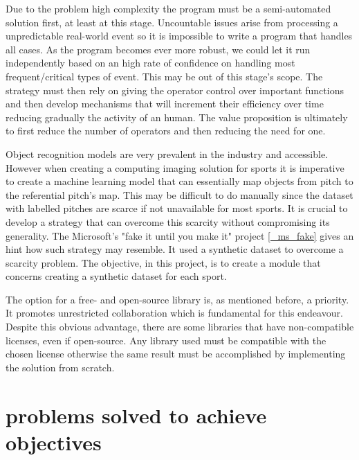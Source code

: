 \documentclass[
11pt,
twoside
]{report}
\begin{document}
Due to the problem high complexity the program must be a semi-automated solution first, at least at this stage. Uncountable issues arise from processing a unpredictable real-world event so it is impossible to write a program that handles all cases. As the program becomes ever more robust, we could let it run independently based on an high rate of confidence on handling most frequent/critical types of event. This may be out of this stage's scope. The strategy must then rely on giving the operator control over important functions and then develop mechanisms that will increment their efficiency over time reducing gradually the activity of an human. The value proposition is ultimately to first reduce the number of operators and then reducing the need for one.


Object recognition models are very prevalent in the industry and accessible. However when creating a computing imaging solution for sports it is imperative to create a machine learning model that can essentially map objects from pitch to the referential pitch's map. This may be difficult to do manually since the dataset with labelled pitches are scarce if not unavailable for most sports. It is crucial to develop a strategy that can overcome this scarcity without compromising its generality. The Microsoft's "fake it until you make it" project \ref{_ms_fake} gives an hint how such strategy may resemble. It used a synthetic dataset to overcome a scarcity problem. The objective, in this project, is to create a module that concerns creating a synthetic dataset for each sport.


The option for a free- and open-source library is, as mentioned before, a priority. It promotes unrestricted collaboration which is fundamental for this endeavour. Despite this obvious advantage, there are some libraries that have non-compatible licenses, even if open-source. Any library used must be compatible with the chosen license otherwise the same result must be accomplished by implementing the solution from scratch.



\section{problems solved to achieve objectives}
\end{document}
